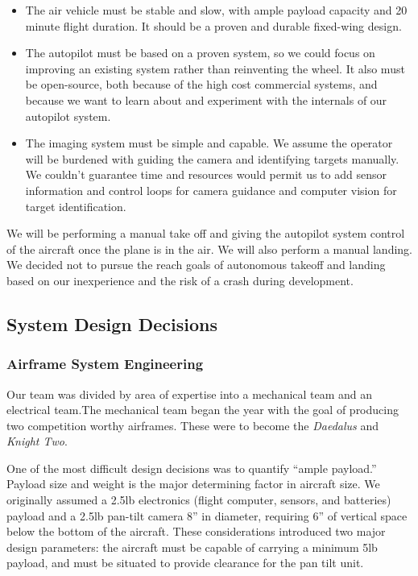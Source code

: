 \documentclass[10pt]{report}
\begin{document}


\begin{itemize}
	\item The air vehicle must be stable and slow, with ample payload capacity and 20 minute flight duration. It should be a proven and durable fixed-wing design.
	\item The autopilot must be based on a proven system, so we could focus on improving an existing system rather than reinventing the wheel. It also must be open-source, both because of the high cost commercial systems, and because we want to learn about and experiment with the internals of our autopilot system.
	\item The imaging system must be simple and capable. We assume the operator will be burdened with guiding the camera and identifying targets manually. We couldn't guarantee time and resources would permit us to add sensor information and control loops for camera guidance and computer vision for target identification.
\end{itemize}

We will be performing a manual take off and giving the autopilot system control of the aircraft once the plane is in the air. We will also perform a manual landing. We decided not to pursue the reach goals of autonomous takeoff and landing based on our inexperience and the risk of a crash during development.
\subsection{System Design Decisions}
\subsubsection{Airframe System Engineering}

Our team was divided by area of expertise into a mechanical team and an electrical team.The mechanical team began the year with the goal of producing two competition worthy airframes. These were to become the \emph{Daedalus} and \emph{Knight Two}.

One of the most difficult design decisions was to quantify ``ample payload.'' Payload size and weight is the major determining factor in aircraft size.  We originally assumed a 2.5lb electronics (flight computer, sensors, and batteries) payload and a 2.5lb pan-tilt camera 8'' in diameter, requiring 6'' of vertical space below the bottom of the aircraft. These considerations introduced two major design parameters: the aircraft must be capable of carrying a minimum 5lb payload, and must be situated to provide clearance for the pan tilt unit.
\end{document}
